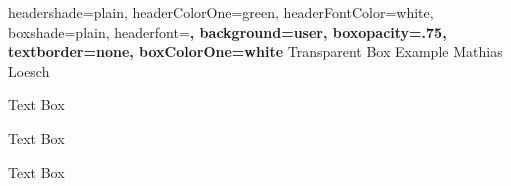 \documentclass[a0paper]{baposter}
\begin{document}
\begin{poster}{
headershade=plain,
headerColorOne=green,
headerFontColor=white,
boxshade=plain,
headerfont=\Large\bfseries,
background=user,
boxopacity=.75,
textborder=none,
boxColorOne=white
}
	{}
	{\color{white}Transparent Box Example}
	{\color{white}Mathias Loesch}
	{}
\begin{posterbox}[name=b1,column=0,row=0, span=1]{Text Box}
\lipsum[1]\end{posterbox}
%
\begin{posterbox}[name=b2,below=auto]{Text Box}
\lipsum[2]\end{posterbox}
%
\begin{posterbox}[name=b3, span=2, column=1]{Text Box}
\lipsum[3]\end{posterbox}


\end{poster}
\end{document}
